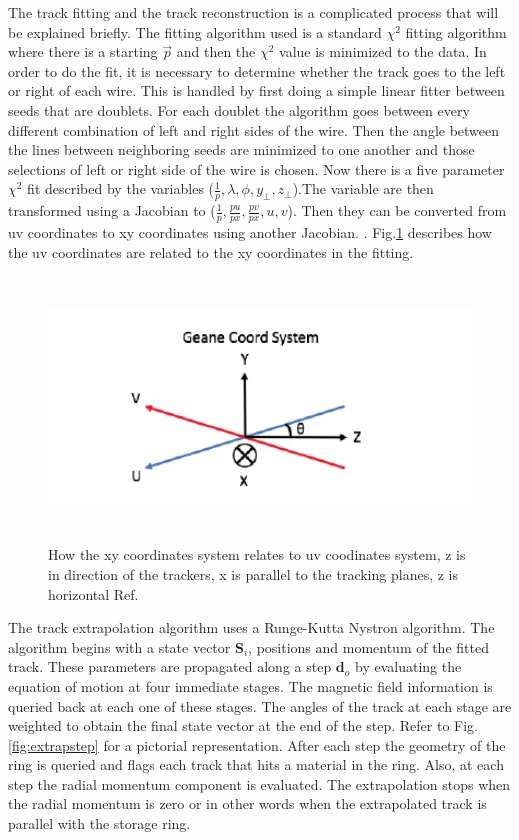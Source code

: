 \documentclass[./Thesis]{subfiles}
\begin{document}
	The track fitting and the track reconstruction is a complicated process that will be explained briefly.  The fitting algorithm used is a standard $\chi^2$ fitting algorithm where there is a starting $\vec{p}$ and then the $\chi^2$ value is minimized to the data.  In order to do the fit, it is necessary to determine whether the track goes to the left or right of each wire. This is handled by first doing a simple linear fitter between seeds that are doublets.  For each doublet the algorithm goes between every different combination of left and right sides of the wire.  Then the angle between the lines between neighboring seeds are minimized to one another and those selections of left or right side of the wire is chosen.  Now there is a five parameter $\chi^2$ fit described by the variables ($\frac{1}{p},\lambda,\phi,y_\perp,z_\perp$).The variable are then transformed using a Jacobian to ($\frac{1}{p},\frac{pu}{px},\frac{pv}{px},u,v$). Then they can be converted from uv coordinates to xy coordinates using another Jacobian. \cite{nickKin}.  Fig.\ref{fig:geanecoord} describes how the uv coordinates are related to the xy coordinates in the fitting.	
	
	
\begin{figure}
	\centerline{\includegraphics[height=70mm]{GeaneCoord.jpeg}}
	\caption[Geane Coordinate System]{  How the xy coordinates system relates to uv coodinates system, z is in direction of the trackers, x is parallel to the tracking planes, z is horizontal Ref.\cite{nickKin}}
	\label{fig:geanecoord}
\end{figure} 
	
	The track extrapolation algorithm uses a Runge-Kutta Nystron algorithm.  The algorithm begins with a state vector $\textbf{S}_i$, positions and momentum of the fitted track.  These parameters are propagated along a step $\textbf{d}_o$ by evaluating the equation of motion at four immediate stages.  The magnetic field information is queried back at each one of these stages.  The angles of the track at each stage are weighted to obtain the final state vector at the end of the step.  Refer to Fig. \ref{fig:extrapstep} for a pictorial representation.  After each step the geometry of the ring is queried and flags each track that hits a material in the ring.  Also, at each step the radial momentum component is evaluated. The extrapolation stops when the radial momentum is zero or in other words when the extrapolated track is parallel with the storage ring. %
	
\end{document}
